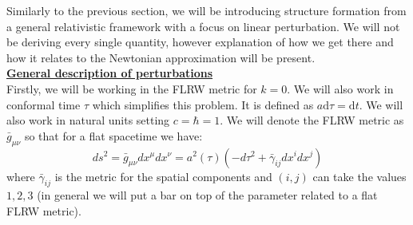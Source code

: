 Similarly to the previous section, we will be introducing structure formation from a general relativistic framework with a focus on linear perturbation. We will not be deriving 
every single quantity, however explanation of how we get there and how it relates to the Newtonian approximation will be present. \\

\noindent \textbf{\underline{General description of perturbations}} \\

Firstly, we will be working in the FLRW metric for $k=0$. We will also work in conformal time $\tau$ which simplifies this problem. 
It is defined as $a \text{d}\tau = \text{d}t$. We will also work in natural units setting $c=\hbar =1$. We will denote the FLRW metric as $\bar{g}_{\mu \nu}$ so that 
for a flat spacetime we have:
\begin{equation}
    ds^2 = \bar{g}_{\mu \nu} dx^{\mu} dx^{\nu} = a^2(\tau)\left( - d\tau^2 + \bar{\gamma}_{ij} dx^{i} dx^{j} \right)
\end{equation}
where $\bar{\gamma}_{ij}$ is the metric for the spatial components and $(i,j)$ can take the values $1,2,3$ (in general we will put a bar on top of the parameter related to a flat FLRW metric). \\

